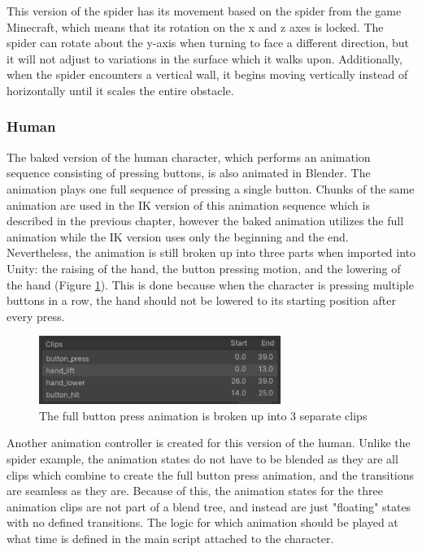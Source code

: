 This version of the spider has its movement based on the spider from the game
Minecraft, which means that its rotation on the x and z axes is locked. The
spider can rotate about the y-axis when turning to face a different direction,
but it will not adjust to variations in the surface which it walks upon.
Additionally, when the spider encounters a vertical wall, it begins moving
vertically instead of horizontally until it scales the entire obstacle.

\subsubsection{Human}
The baked version of the human character, which performs an animation sequence
consisting of pressing buttons, is also animated in Blender. The animation plays
one full sequence of pressing a single button. Chunks of the same animation are
used in the IK version of this animation sequence which is described in the
previous chapter, however the baked animation utilizes the full animation while
the IK version uses only the beginning and the end. Nevertheless, the animation
is still broken up into three parts when imported into Unity: the raising of the
hand, the button pressing motion, and the lowering of the hand (Figure
\ref{fig:bp_clips}). This is done because when the character is pressing
multiple buttons in a row, the hand should not be lowered to its starting
position after every press.

\begin{figure}[h!]
    \centering
    \captionsetup{justification=centering}
    \includegraphics[width=0.7\textwidth]{grafika/bp_clips.png}
    \caption{The full button press animation is broken up into 3 separate clips}
    \label{fig:bp_clips}
\end{figure}

Another animation controller is created for this version of the human. Unlike
the spider example, the animation states do not have to be blended as they are
all clips which combine to create the full button press animation, and the
transitions are seamless as they are. Because of this, the animation states for
the three animation clips are not part of a blend tree, and instead are just
"floating" states with no defined transitions. The logic for which animation
should be played at what time is defined in the main script attached to the
character. 

